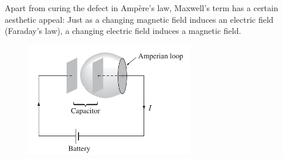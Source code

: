 \documentclass[../../../main.tex]{subfiles}
\begin{document}
Apart from curing the defect in Ampère’s law, Maxwell’s term has a certain aesthetic appeal: Just as a changing magnetic ﬁeld induces an electric ﬁeld (Faraday’s law), a changing electric ﬁeld induces a magnetic ﬁeld.
\begin{figure}[b]
    \centering
    \includegraphics[width=0.65\textwidth]{../Rss/Electromagnetism/Electrodynamics/BrokenAmpereLaw.png}
\end{figure}
\end{document}

